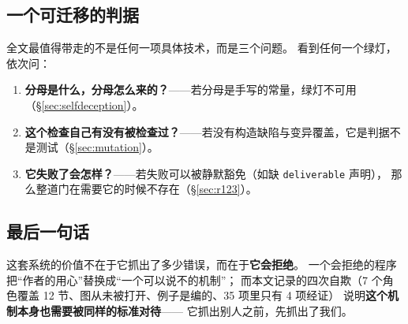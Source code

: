 \documentclass[11pt,a4paper]{article}
\newcommand{\code}[1]{\texttt{#1}}
\begin{document}
\subsection{一个可迁移的判据}
全文最值得带走的不是任何一项具体技术，而是三个问题。
看到任何一个绿灯，依次问：

\begin{enumerate}[leftmargin=1.6em,itemsep=2pt]
\item \textbf{分母是什么，分母怎么来的？}——若分母是手写的常量，绿灯不可用（§\ref{sec:selfdeception}）。
\item \textbf{这个检查自己有没有被检查过？}——若没有构造缺陷与变异覆盖，它是判据不是测试（§\ref{sec:mutation}）。
\item \textbf{它失败了会怎样？}——若失败可以被静默豁免（如缺 \code{deliverable} 声明），
  那么整道门在需要它的时候不存在（§\ref{sec:r123}）。
\end{enumerate}

\subsection{最后一句话}
这套系统的价值不在于它抓出了多少错误，而在于\textbf{它会拒绝}。
一个会拒绝的程序把“作者的用心”替换成“一个可以说不的机制”；
而本文记录的四次自欺（7 个角色覆盖 12 节、图从未被打开、例子是编的、35 项里只有 4 项经证）
说明\textbf{这个机制本身也需要被同样的标准对待}——
它抓出别人之前，先抓出了我们。
\end{document}
